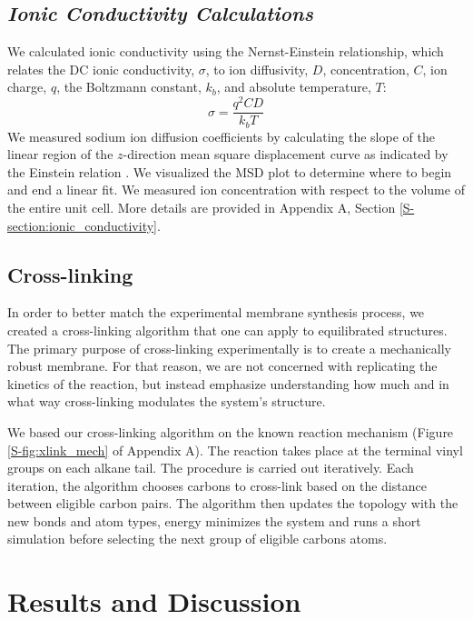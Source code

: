   \subsection{\textit{Ionic Conductivity Calculations}}\label{method:ionic_conductivity}

  We calculated ionic conductivity using the Nernst-Einstein relationship, which 
  relates the DC ionic conductivity, $\sigma$, to ion diffusivity, $D$, 
  concentration, $C$, ion charge, $q$, the Boltzmann constant, $k_b$, and 
  absolute temperature, $T$: 
  \begin{equation}
	\sigma = \dfrac{q^2CD}{k_b T} 
	\label{eqn:nernst_einstein}
  \end{equation}
  We measured sodium ion diffusion coefficients by calculating the slope
  of the linear region of the $z$-direction mean square displacement curve as
  indicated by the Einstein relation \cite{einstein_investigations_1956}. We
  visualized the MSD plot to determine where to begin and end a linear fit. We
  measured ion concentration with respect to the volume of the entire unit cell. 
  More details are provided in Appendix A, Section \ref{S-section:ionic_conductivity}.

  \subsection{Cross-linking}\label{method:xlink}
  
  In order to better match the experimental membrane synthesis process,
  we created a cross-linking algorithm that one can apply to equilibrated structures. 
  The primary purpose of cross-linking experimentally is to create a mechanically robust membrane.
  For that reason, we are not concerned with replicating the kinetics of the reaction, 
  but instead emphasize understanding how much and in what way cross-linking modulates
  the system's structure.

  We based our cross-linking algorithm on the known reaction mechanism 
  (Figure \ref{S-fig:xlink_mech} of Appendix A). The reaction 
  takes place at the terminal vinyl groups
  on each alkane tail. The procedure is carried out iteratively. Each iteration, the
  algorithm chooses carbons to cross-link based on the distance between eligible 
  carbon pairs. The algorithm then updates the topology with the new bonds and atom
  types, energy minimizes the system and runs a short simulation before selecting 
  the next group of eligible carbons atoms.
  
  \section{Results and Discussion}
  
